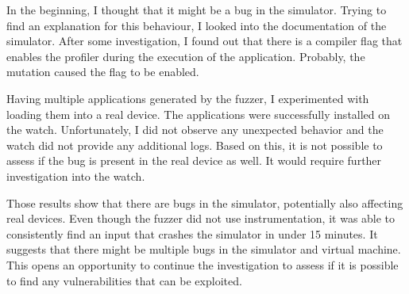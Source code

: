 In the beginning, I thought that it might be a bug in the simulator.
Trying to find an explanation for this behaviour, I looked into the documentation of the simulator.
After some investigation, I found out that there is a compiler flag that enables the profiler during the execution of the application.
Probably, the mutation caused the flag to be enabled.

Having multiple applications generated by the fuzzer, I experimented with loading them into a real device.
The applications were successfully installed on the watch.
Unfortunately, I did not observe any unexpected behavior and the watch did not provide any additional logs.
Based on this, it is not possible to assess if the bug is present in the real device as well.
It would require further investigation into the watch.

Those results show that there are bugs in the simulator, potentially also affecting real devices.
Even though the fuzzer did not use instrumentation, it was able to consistently find an input that crashes the simulator in under 15 minutes.
It suggests that there might be multiple bugs in the simulator and virtual machine.
This opens an opportunity to continue the investigation to assess if it is possible to find any vulnerabilities that can be exploited.